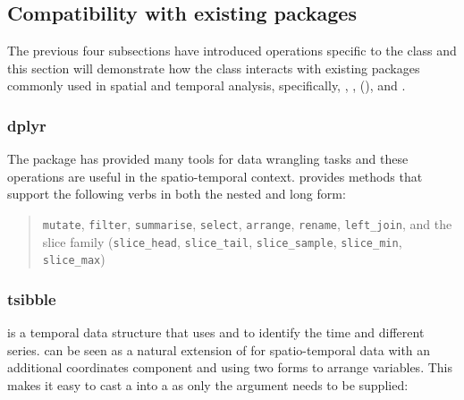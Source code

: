 \documentclass[
]{jss}
\begin{document}
\hypertarget{compatibility-with-existing-packages}{%
\subsection{Compatibility with existing packages}\label{compatibility-with-existing-packages}}

The previous four subsections have introduced operations specific to the  class and this section will demonstrate how the  class interacts with existing packages commonly used in spatial and temporal analysis, specifically, , ,  (), and .

\hypertarget{dplyr}{%
\subsubsection{dplyr}\label{dplyr}}

The  package has provided many tools for data wrangling tasks and these operations are useful in the spatio-temporal context.  provides methods that support the following  verbs in both the nested and long form:

\begin{quote}
\texttt{mutate}, \texttt{filter}, \texttt{summarise}, \texttt{select}, \texttt{arrange}, \texttt{rename}, \texttt{left\_join}, and the slice family (\texttt{slice\_head}, \texttt{slice\_tail}, \texttt{slice\_sample}, \texttt{slice\_min}, \texttt{slice\_max})
\end{quote}

\hypertarget{tsibble}{%
\subsubsection{tsibble}\label{tsibble}}

 is a temporal data structure that uses  and  to identify the time and different series.  can be seen as a natural extension of  for spatio-temporal data with an additional coordinates component and using two forms to arrange variables. This makes it easy to cast a  into a  as only the  argument needs to be supplied:
\end{document}
